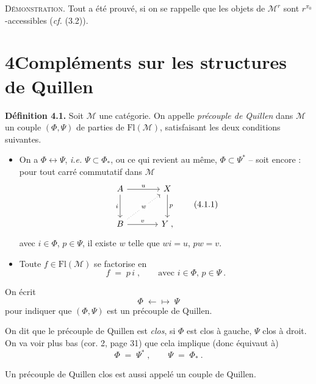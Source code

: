 \documentclass[11pt]{article}
\newcommand{\printedpage}[1]{\marginpar{\footnotesize p.~#1}}
\newcommand{\msp}[1]{\marginpar{\footnotesize [#1]}}
\newcommand{\Fl}{\mathrm{Fl}}
\newcommand{\qpre}{\mathrel{\leftarrow\!\!\!\!\mapsto}}
\begin{document}
\printedpage{19}

\msp{page 28}
\textsc{Démonstration}. Tout a été prouvé, si on se rappelle que les objets de $\mathcal{M}^r$ sont $r^{\pi_0}$-accessibles (\textit{cf.} (3.2)).

\section*{4\quad Compléments sur les structures de Quillen}

\textbf{Définition 4.1.} Soit $\mathcal{M}$ une catégorie. On appelle \textit{précouple de Quillen} dans $\mathcal{M}$ un couple $(\Phi,\Psi)$ de parties de $\Fl(\mathcal{M})$, satisfaisant les deux conditions suivantes.
\begin{itemize}[leftmargin=2.5em]
\item[\textit{a})] On a $\Phi\longleftrightarrow\Psi$, \textit{i.e.} $\Psi\subset\Phi_*$, ou ce qui revient au même, $\Phi\subset\Psi^*$ -- soit encore : pour tout carré commutatif dans $\mathcal{M}$
\[
\begin{tikzcd}[row sep=large, column sep=large]
A \arrow[r, "u"] \arrow[d, "i"'] & X \arrow[d, "p"] \\
B \arrow[ur, dotted, "w" description] \arrow[r, "v"] & Y \;,
\end{tikzcd}
\tag*{(4.1.1)}
\]
avec $i\in\Phi$, $p\in\Psi$, il existe $w$ telle que $wi=u$, $pw=v$.
\item[\textit{b})] Toute $f\in\Fl(\mathcal{M})$ se factorise en
\[
f \;=\; p\,i\;, \qquad \text{avec } i\in\Phi,\, p\in\Psi\ .
\]
\end{itemize}
On écrit
\[
\Phi \;\qpre\; \Psi
\tag*{(4.1.2)}
\] %
pour indiquer que $(\Phi,\Psi)$ est un précouple de Quillen.

On dit que le précouple de Quillen est \textit{clos}, si $\Phi$ est clos à gauche, $\Psi$ clos à droit. On va voir plus bas (cor. 2, page 31) que cela implique (donc équivaut à) %
\[
\Phi \;=\; \Psi^*\;, \qquad \Psi \;=\; \Phi_*\ .
\tag*{(4.1.3)}
\]

\msp{page 29}
Un précouple de Quillen clos est aussi appelé un couple de Quillen.
\end{document}
